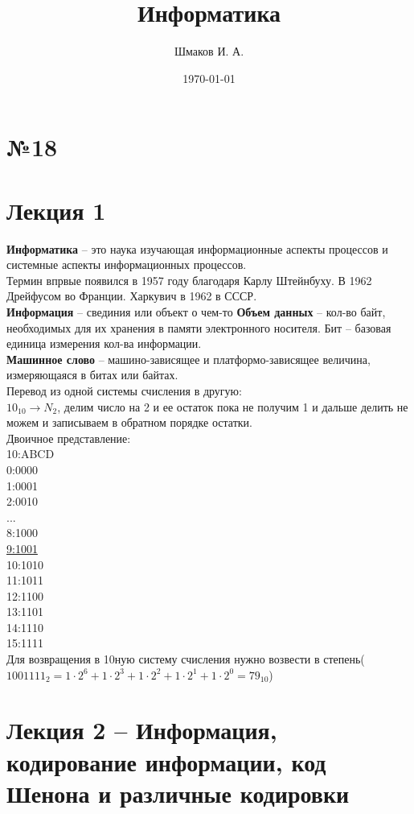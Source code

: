 \documentclass[a4paper, 12pt]{article}
\title{Информатика}
\author{Шмаков И. А.}
\date{\today}
\begin{document}
\sffamily
\maketitle
\section*{№18}
\section*{Лекция 1}
\textbf{Информатика} -- это наука изучающая информационные аспекты процессов и системные аспекты информационных процессов.\\
Термин впрвые появился в 1957 году благодаря Карлу Штейнбуху. В 1962 Дрейфусом во Франции. Харкувич в 1962 в СССР.\\
\textbf{Информация} -- свединия или объект о чем-то
\textbf{Объем данных} -- кол-во байт, необходимых для их хранения в памяти электронного носителя. Бит -- базовая единица измерения кол-ва информации.\\
\textbf{Машинное слово} -- машино-зависящее и платформо-зависящее величина, измеряющаяся в битах или байтах.
\\ Перевод из одной системы счисления в другую:\\
$ 10_{10} \to N_{2} $, делим число на 2 и ее остаток пока не получим 1 и дальше делить не можем и записываем в обратном порядке остатки.\\
Двоичное представление:\\
10:ABCD\\
0:0000\\
1:0001\\
2:0010\\
  ...\\
8:1000\\
\underline{9:1001}\\
10:1010\\
11:1011\\
12:1100\\
13:1101\\
14:1110\\
15:1111\\

Для возвращения в 10ную систему счисления нужно возвести в степень($   1001111_2 = 1\cdot2^6 +1\cdot2^3+1\cdot2^2+1\cdot2^1+1\cdot2^0 = 79_{10}$)




\section*{Лекция 2 -- Информация, кодирование информации, код Шенона и различные кодировки}
\end{document}

